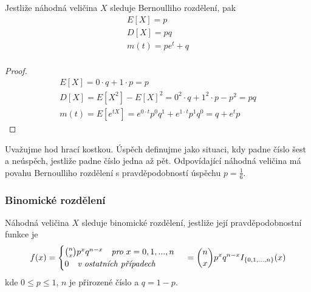 \begin{theorem}
Jestliže náhodná veličina $X$ sleduje Bernoulliho rozdělení, pak
\begin{gather*}
E[X] = p\\
D[X] = pq\\
m(t) = pe^t + q\\
\end{gather*}
\end{theorem}

\begin{proof}
\begin{gather*}
E[X] = 0 \cdot q + 1 \cdot p = p\\
D[X] = E[X^2] - E[X]^2 = 0^2 \cdot q + 1^2 \cdot p - p^2 = pq\\
m(t) = E[e^{tX}] = e^{0 \cdot t} p^0 q^1 + e^{1 \cdot t} p^1 q^0 = q + e^t p
\end{gather*}
\end{proof}

\begin{example}
Uvažujme hod hrací kostkou. Úspěch definujme jako situaci, kdy padne číslo šest a neúspěch, jestliže padne číslo jedna až pět. Odpovídající náhodná veličina má povahu Bernoulliho rozdělení s pravděpodobností úspěchu $p = \frac{1}{6}$.
\end{example}

\subsubsection{Binomické rozdělení}

\begin{definition}
Náhodná veličina $X$ sleduje binomické rozdělení, jestliže její pravděpodobnostní funkce je
\begin{equation*}
f(x) = 
\begin{cases}
\binom{n}{x} p^x q^{n-x}~~~\textit{pro}~x=0,1,...,n\\
0~~~\textit{v ostatních případech}
\end{cases}\\
=\binom{n}{x}p^xq^{n-x}I_{\{0,1,...,n\}}(x)
\end{equation*}
kde $0 \le p \le 1$, $n$ je přirozené číslo a $q = 1 - p$.
\end{definition}

